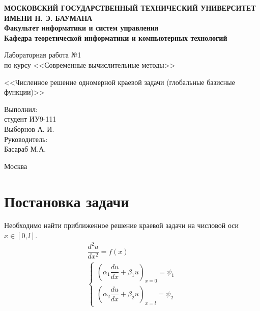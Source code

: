 \documentclass[12pt,a4paper,oneside]{extarticle}
\begin{document}
\pgfplotsset{compat=1.8}

\thispagestyle{empty}
\newpage
{
\centering


\textbf{
МОСКОВСКИЙ ГОСУДАРСТВЕННЫЙ ТЕХНИЧЕСКИЙ УНИВЕРСИТЕТ ИМЕНИ Н. Э. БАУМАНА \\
Факультет информатики и систем управления \\
Кафедра теоретической информатики и компьютерных технологий}
\bigskip
\bigskip
\bigskip
\bigskip
\bigskip
\bigskip
\bigskip

\vfill


Лабораторная работа №1 \\
по курсу <<Современные вычислительные методы>>

\bigskip

{\large <<Численное решение одномерной краевой задачи (глобальные базисные функции)>>}
\bigskip

\vfill



\hfill\parbox{4cm} {
Выполнил:\\
студент ИУ9-111 \hfill \\
Выборнов А. И.\hfill \medskip\\
Руководитель:\\
Басараб М.А.\hfill
}


\vspace{\fill}

Москва \number\year
\clearpage
}

\clearpage



\section{Постановка задачи}
    Необходимо найти приближенное решение краевой задачи на числовой оси $x \in [0, l]$.
    \begin{gather}
        \dfrac{d^2u}{dx^2} = f(x) \nonumber \\
        \begin{cases}
            \left( \alpha_1 \dfrac{du}{dx} + \beta_1 u \right)_{x=0} = \psi_1 \nonumber \\
            \left( \alpha_2 \dfrac{du}{dx} + \beta_2 u \right)_{x=l} = \psi_2 \nonumber
        \end{cases}
    \end{gather}
    
\end{document}
